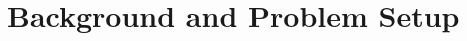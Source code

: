 \documentclass{article}
\theoremstyle{plain}
\theoremstyle{definition}
\theoremstyle{remark}
\begin{document}








\section{Background and Problem Setup}
\label{sec:background}

\end{document}
